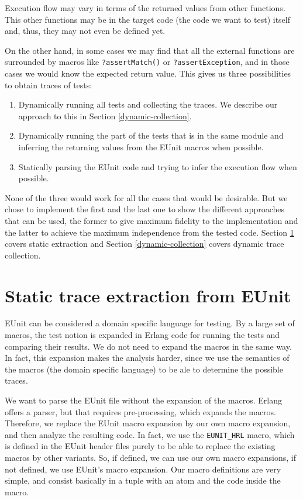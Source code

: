 \documentclass[]{sigplanconf}
\begin{document}
Execution flow may vary in terms of the returned values
from other functions. This other functions may be in the target code
(the code we want to test) itself and, thus, they may not even be
defined yet.

On the other hand, in some cases we may find that all the external
functions are surrounded by macros like \texttt{?assertMatch()} or
\texttt{?assertException}, and in those cases we would know the
expected return value.
This gives us three possibilities to obtain traces of tests:
\begin{enumerate}
 \item Dynamically running all tests and collecting the traces. We describe our approach to this in Section \ref{dynamic-collection}.
 \item Dynamically running the part of the tests that is in the same
module and inferring the returning values from the EUnit macros when
possible.
 \item Statically parsing the EUnit code and trying to infer the
execution flow when possible.
\end{enumerate}
None of the three would work for all the cases that would be desirable.
But we chose to implement the first and the last one to show the different approaches that can be used, the former to give maximum fidelity to the implementation and the latter to achieve the maximum independence from the tested code. Section \ref{static} covers static extraction and Section \ref{dynamic-collection} covers dynamic trace collection.

\section{Static trace extraction from EUnit}
\label{static}

EUnit can be considered a domain specific language for testing. By a large set of macros, the test notion is expanded in Erlang code for running the tests and comparing their results. We do not need to expand the macros in the same way. In fact, this expansion makes the analysis harder, since we use the semantics of the macros (the domain specific language) to be ale to determine the possible traces.

We want to parse the EUnit file without the expansion of the macros. Erlang offers a parser, but that requires pre-processing, which expands the macros.
Therefore, we replace the EUnit macro expansion by our own macro expansion, and then analyze the resulting code. In fact, we use the \verb+EUNIT_HRL+ macro, which is defined in the EUnit 
header files purely to be able to replace the existing macros by other variants. So, if defined, we can use our own macro expansions, if not defined, we use EUnit’s macro expansion.
Our macro definitions are very simple, and consist basically in a tuple with an atom and the code inside the macro.
\end{document}
